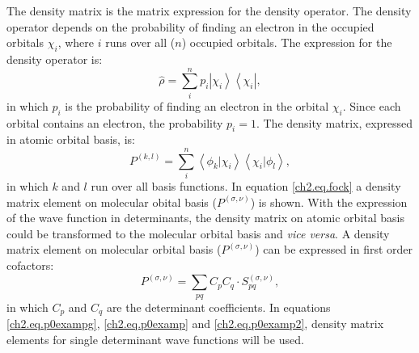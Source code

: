 The density matrix is the matrix expression for the density operator. The density operator depends on the probability of finding an electron in the occupied orbitals $\chi_i$, where $i$ runs over all ($n$) occupied orbitals. The expression for the density operator is:
\begin{equation}
\hat{\rho}=\sum_i^n p_i \left| \chi_i \right> \left< \chi_i \right|,
\end{equation}
in which $p_i$ is the probability of finding an electron in the orbital $\chi_i$. Since each orbital contains an electron, the probability $p_i = 1$. The density matrix, expressed in atomic orbital basis, is:
\begin{equation}
P^{(k,l)}=\sum_i^n \left< \phi_k | \chi_i \right> \left< \chi_i | \phi_l \right>,
\end{equation}
in which $k$ and $l$ run over all basis functions. In equation \ref{ch2.eq.fock} a density matrix element on molecular obital basis ($P^{(\sigma,\nu)}$) is shown. With the expression of the wave function in determinants, the density matrix on atomic orbital basis could be transformed to the molecular orbital basis and \textit{vice versa}. A density matrix element on molecular orbital basis ($P^{(\sigma,\nu)}$) can be expressed in first order cofactors: 
\begin{equation}
P^{(\sigma,\nu)} = \sum_{pq} C_p C_q \cdot S^{(\sigma,\nu)}_{pq},
\end{equation}
in which $C_p$ and $C_q$ are the determinant coefficients. In equations \ref{ch2.eq.p0exampg}, \ref{ch2.eq.p0examp} and \ref{ch2.eq.p0examp2}, density matrix elements for single determinant wave functions will be used.

